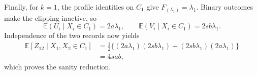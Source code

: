 Finally, for \(k=1\), the profile identities on \(C_1\) give \(F_{(\lambda_1)}=\lambda_1\).  Binary outcomes make the clipping inactive, so
\[
 \mathbb E(U_i\mid X_i\in C_1)=2a\lambda_1,
 \qquad
 \mathbb E(V_i\mid X_i\in C_1)=2sb\lambda_1.
\]
Independence of the two records now yields
\[
 \begin{aligned}
 \mathbb E\!\left[Z_{12}\mid X_1,X_2\in C_1\right]
 &=\frac12\{(2a\lambda_1)(2sb\lambda_1)
 +(2sb\lambda_1)(2a\lambda_1)\}\\
 &=4sab,
 \end{aligned}
\]
which proves the sanity reduction.
